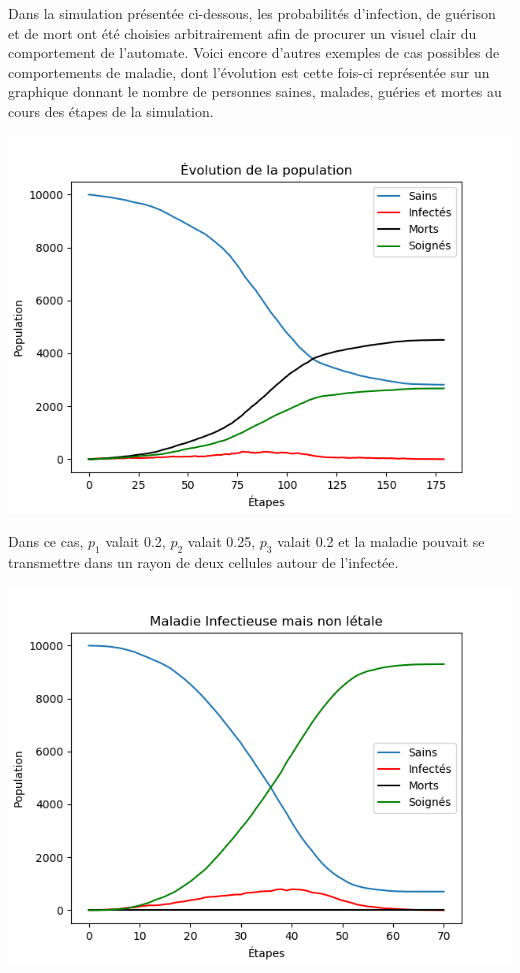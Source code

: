 \documentclass{article}
\begin{document}
Dans la simulation présentée ci-dessous, les probabilités d'infection, de guérison et de mort ont été choisies arbitrairement afin de procurer un visuel clair du comportement de l'automate. Voici encore d'autres exemples de cas possibles de comportements de maladie, dont l'évolution est cette fois-ci représentée sur un graphique donnant le nombre de personnes saines, malades, guéries et mortes au cours des étapes de la simulation.



\includegraphics[scale=1]{../images/g.png} 


	Dans ce cas, $p_1$ valait 0.2, $p_2$ valait 0.25, $p_3$ valait 0.2 et la maladie pouvait se transmettre dans un rayon de deux cellules autour de l'infectée.

\includegraphics[scale=1]{../images/Figure_2.png}
\end{document}
